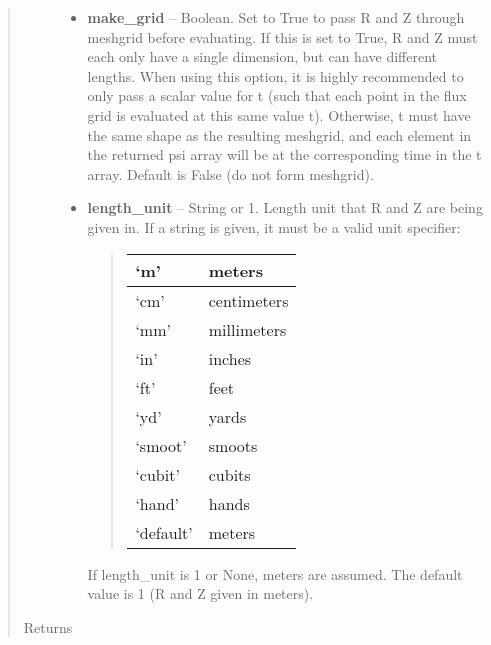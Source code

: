 \documentclass[letterpaper,10pt,english]{sphinxmanual}
\begin{document}
\begin{fulllineitems}
\begin{fulllineitems}
\begin{quote}
\begin{description}
\begin{itemize}
\item {} 
\textbf{make\_grid} --
Boolean. Set to True to pass R and Z through meshgrid
before evaluating. If this is set to True, R and Z must each
only have a single dimension, but can have different lengths.
When using this option, it is highly recommended to only pass
a scalar value for t (such that each point in the flux grid is
evaluated at this same value t). Otherwise, t must have the
same shape as the resulting meshgrid, and each element in the
returned psi array will be at the corresponding time in the t
array. Default is False (do not form meshgrid).

\item {} 
\textbf{length\_unit} --
String or 1. Length unit that R and Z are being given
in. If a string is given, it must be a valid unit specifier:
\begin{quote}

\begin{tabulary}{\linewidth}{|L|L|}
\hline

`m'
 & 
meters
\\\hline

`cm'
 & 
centimeters
\\\hline

`mm'
 & 
millimeters
\\\hline

`in'
 & 
inches
\\\hline

`ft'
 & 
feet
\\\hline

`yd'
 & 
yards
\\\hline

`smoot'
 & 
smoots
\\\hline

`cubit'
 & 
cubits
\\\hline

`hand'
 & 
hands
\\\hline

`default'
 & 
meters
\\\hline
\end{tabulary}

\end{quote}

If length\_unit is 1 or None, meters are assumed. The default
value is 1 (R and Z given in meters).

\end{itemize}

\item[{Returns}] \leavevmode


\end{description}
\end{quote}
\end{fulllineitems}
\end{fulllineitems}
\end{document}
